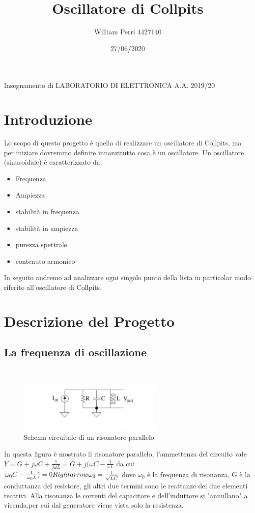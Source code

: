 \documentclass{article}
\title{Oscillatore di Collpits}
\author{William Perri 4427140 }
\date{27/06/2020}
\begin{document}
\maketitle
Insegnamento di LABORATORIO DI ELETTRONICA A.A. 2019/20

\newpage
\tableofcontents
\newpage
\section{Introduzione}
Lo scopo di questo progetto è quello di realizzare un oscillatore di Collpits, ma per iniziare dovremmo definire innanzitutto cosa è un oscillatore.
Un oscillatore (sinusoidale) è caratterizzato da:
\begin{itemize}
\item Frequenza
\item Ampiezza
\item stabilità in frequenza
\item stabilità in ampiezza
\item purezza spettrale
\item contenuto armonico
\end{itemize}
In seguito andremo ad analizzare ogni singolo punto della lista in particolar modo riferito all'oscillatore di Collpits.
\newpage
\section{Descrizione del Progetto}
\subsection{La frequenza di oscillazione}
~\begin{figure}[H]
\includegraphics[scale=1]{RisonatoreParallelo.png} 
\caption{Schema circuitale di un risonatore parallelo}
\label{fig:foo}
\end{figure}
In questa figura è mostrato il risonatore parallelo, l'ammettenza del circuito vale 
$Y=G+j\omega C+\frac{1}{j\omega L}=G+j(\omega C-\frac{1}{\omega L}$ da cui $\omega_0C-\frac{1}{\omega _0L})=0\\Rightarrow\omega _0=\frac{1}{\sqrt{LC}}$ dove $\omega _0$ è la frequenza di risonanza, G è la conduttanza del resistore, gli altri due termini sono le reattanze dei due elementi reattivi.
Alla risonanza le correnti del capacitore e dell'induttore si "annullano" a vicenda,per cui dal generatore viene vista solo la resistenza. 
\end{document}
